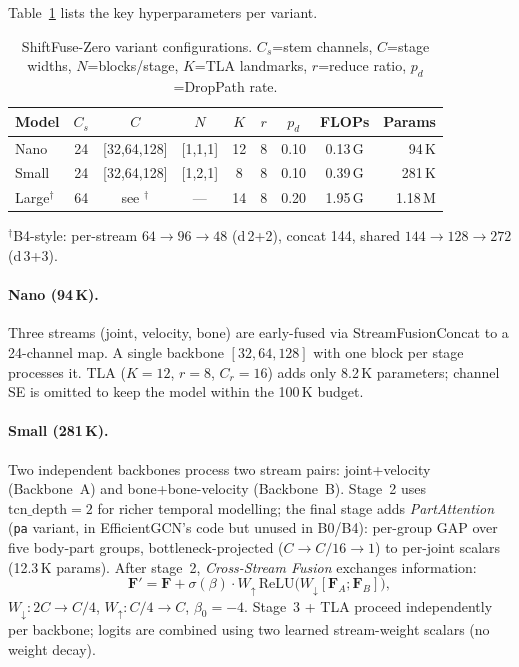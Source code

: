 \documentclass[sigconf,screen,review,anonymous]{acmart}
\begin{document}
Table~\ref{tab:variants} lists the key hyperparameters per variant.

\begin{table}[t]
\centering
\caption{ShiftFuse-Zero variant configurations.
  $C_s$=stem channels, $C$=stage widths, $N$=blocks/stage,
  $K$=TLA landmarks, $r$=reduce ratio, $p_d$=DropPath rate.}
\label{tab:variants}
\setlength{\tabcolsep}{3.5pt}
\renewcommand{\arraystretch}{1.05}
\begin{tabular}{lcccccccr}
\toprule
Model  & $C_s$ & $C$           & $N$     & $K$ & $r$ & $p_d$ & FLOPs & Params \\
\midrule
Nano   & 24 & [32,64,128]   & [1,1,1] & 12 & 8  & 0.10 & 0.13\,G & 94\,K \\
Small  & 24 & [32,64,128]   & [1,2,1] & 8  & 8  & 0.10 & 0.39\,G & 281\,K \\
Large$^\dagger$ & 64 & see $^\dagger$ & --- & 14 & 8  & 0.20 & 1.95\,G & 1.18\,M \\
\bottomrule
\end{tabular}
\smallskip
\footnotesize{$^\dagger$B4-style: per-stream $64{\to}96{\to}48$ (d\,2+2), concat 144, shared $144{\to}128{\to}272$ (d\,3+3).}
\vspace{-3mm}\end{table}

\paragraph{Nano (94\,K).}
Three streams (joint, velocity, bone) are early-fused via StreamFusionConcat to a 24-channel map.
A single backbone $[32,64,128]$ with one block per stage processes it.
TLA ($K{=}12$, $r{=}8$, $C_r{=}16$) adds only 8.2\,K parameters;
channel SE is omitted to keep the model within the 100\,K budget.

\paragraph{Small (281\,K).}
Two independent backbones process two stream pairs:
joint+velocity (Backbone~A) and bone+bone-velocity (Backbone~B).
Stage~2 uses $\text{tcn\_depth}{=}2$ for richer temporal modelling;
the final stage adds \emph{PartAttention}~\cite{efficientgcn} (\texttt{pa} variant,
in EfficientGCN's code but unused in B0/B4): per-group GAP over five
body-part groups, bottleneck-projected ($C{\to}C/16{\to}1$)
to per-joint scalars (12.3\,K params).
After stage~2, \emph{Cross-Stream Fusion} exchanges information:
\begin{equation}
  \mathbf{F}' = \mathbf{F} + \sigma(\beta)\cdot
    W_\uparrow\,\mathrm{ReLU}\!\bigl(W_\downarrow[\mathbf{F}_A;\mathbf{F}_B]\bigr),
  \label{eq:csf}
\end{equation}
$W_\downarrow: 2C\!\to\!C/4$, $W_\uparrow: C/4\!\to\!C$, $\beta_0{=}{-}4$.
Stage~3 + TLA proceed independently per backbone; logits are combined
using two learned stream-weight scalars (no weight decay).
\end{document}
